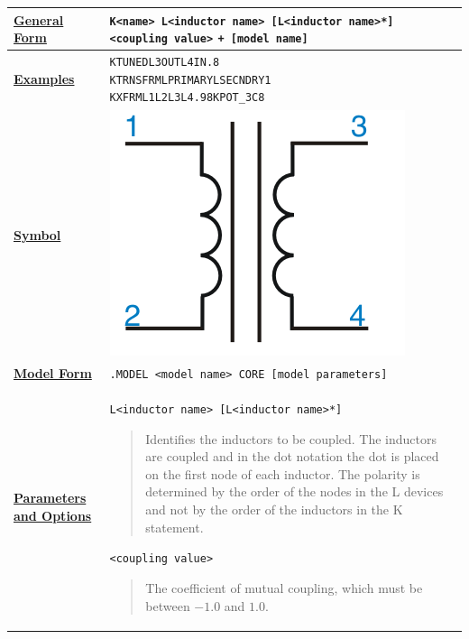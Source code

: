 


\small
\begin{longtable}[Hh]{>{\setlength{\hsize}{.2\hsize}}YY} \hline

\underline{\bf General Form} &
\verb|K<name> L<inductor name> [L<inductor name>*] <coupling value>|
\verb|+ [model name] | \\ \hline

\underline{\bf Examples} &
\begin{alltt}
KTUNED L3OUT  L4IN .8
KTRNSFRM LPRIMARY LSECNDRY 1
KXFRM L1 L2  L3  L4 .98 KPOT\_3C8
\end{alltt} \\ \hline

\underline{\bf Symbol} &
{\includegraphics{transformerSymbol}}
\\ \hline

\underline{\bf Model Form} &
\verb|.MODEL <model name> CORE [model parameters]| \\ \hline

\underline{\bf Parameters} \underline{\bf and Options} &
\texttt{L<inductor name> [L<inductor name>*]}
\begin{quote}
  Identifies the inductors to be coupled. The inductors are coupled and in
  the dot notation the dot is placed on the first node of each inductor. The
  polarity is determined by the order of the nodes in the L devices and not by
  the order of the inductors in the K statement.
\end{quote}
\texttt{<coupling value>}
\begin{quote}
  The coefficient of mutual coupling, which must be between $-1.0$
  and $1.0$.


\end{quote}
\end{longtable}

